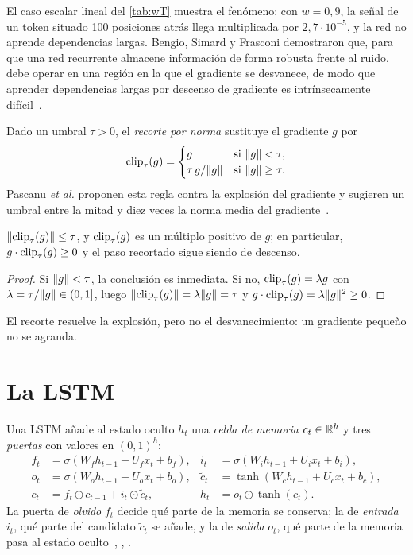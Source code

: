 El caso escalar lineal del \cref{tab:wT} muestra el fenómeno: con $w=0{,}9$, la señal de un token situado 100 posiciones atrás llega multiplicada por $2{,}7\cdot 10^{-5}$, y la red no aprende dependencias largas. Bengio, Simard y Frasconi demostraron que, para que una red recurrente almacene información de forma robusta frente al ruido, debe operar en una región en la que el gradiente se desvanece, de modo que aprender dependencias largas por descenso de gradiente es intrínsecamente difícil~\cite{bengio94}.

\begin{definicion}
Dado un umbral $\tau>0$, el \emph{recorte por norma} sustituye el gradiente $g$ por
\[
\operatorname{clip}_{\tau}(g)=\begin{cases} g & \text{si } \lVert g\rVert<\tau,\\ \tau\,g/\lVert g\rVert & \text{si } \lVert g\rVert\ge\tau.\end{cases}
\]
Pascanu \emph{et al.} proponen esta regla contra la explosión del gradiente y sugieren un umbral entre la mitad y diez veces la norma media del gradiente~\cite[§3.2]{pascanu}.
\end{definicion}

\begin{proposicion}\label{prop:clip}
$\lVert\operatorname{clip}_{\tau}(g)\rVert\le\tau$, y $\operatorname{clip}_{\tau}(g)$ es un múltiplo positivo de $g$; en particular, $g\cdot\operatorname{clip}_{\tau}(g)\ge 0$ y el paso recortado sigue siendo de descenso.
\end{proposicion}

\begin{proof}
Si $\lVert g\rVert<\tau$, la conclusión es inmediata. Si no, $\operatorname{clip}_{\tau}(g)=\lambda g$ con $\lambda=\tau/\lVert g\rVert\in(0,1]$, luego $\lVert\operatorname{clip}_{\tau}(g)\rVert=\lambda\lVert g\rVert=\tau$ y $g\cdot\operatorname{clip}_{\tau}(g)=\lambda\lVert g\rVert^{2}\ge 0$.
\end{proof}

El recorte resuelve la explosión, pero no el desvanecimiento: un gradiente pequeño no se agranda.

\section{La LSTM}

\begin{definicion}[LSTM]\label{def:lstm}
Una LSTM añade al estado oculto $h_t$ una \emph{celda de memoria} $c_t\in\mathbb{R}^{h}$ y tres \emph{puertas} con valores en $(0,1)^{h}$:
\[
\begin{aligned}
f_t&=\sigma(W_f h_{t-1}+U_f x_t+b_f), & i_t&=\sigma(W_i h_{t-1}+U_i x_t+b_i),\\
o_t&=\sigma(W_o h_{t-1}+U_o x_t+b_o), & \tilde c_t&=\tanh(W_c h_{t-1}+U_c x_t+b_c),\\
c_t&=f_t\odot c_{t-1}+i_t\odot\tilde c_t, & h_t&=o_t\odot\tanh(c_t).
\end{aligned}
\]
La puerta de \emph{olvido} $f_t$ decide qué parte de la memoria se conserva; la de \emph{entrada} $i_t$, qué parte del candidato $\tilde c_t$ se añade, y la de \emph{salida} $o_t$, qué parte de la memoria pasa al estado oculto~\cite{lstm}, \cite[§14.5]{jm3}, \cite[§10.1]{d2l}.
\end{definicion}

